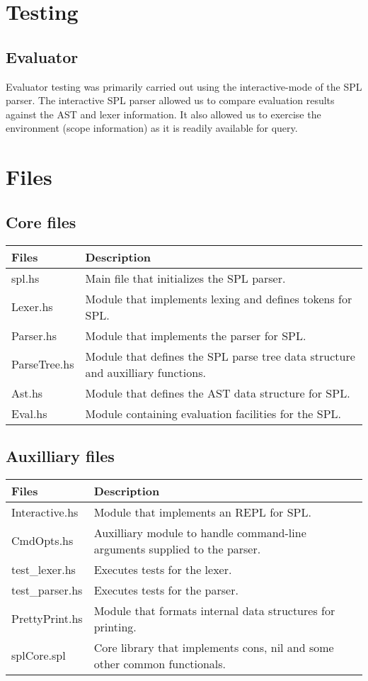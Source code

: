 \documentclass{article}
\begin{document}
\section{Testing}

\subsection{Evaluator}
Evaluator testing was primarily carried out using the interactive-mode of the SPL parser.
The interactive SPL parser allowed us to compare evaluation results against the AST and lexer information.
It also allowed us to exercise the environment (scope information) as it is readily available for query.

\section{Files}
\subsection{Core files}
\begin{tabular}{|l|l|}
  \hline
{\bf Files}&{\bf Description}\\
  \hline
spl.hs & Main file that initializes the SPL parser.\\
  \hline
Lexer.hs & Module that implements lexing and defines tokens for SPL.\\
  \hline
Parser.hs & Module that implements the parser for SPL.\\
  \hline
ParseTree.hs & Module that defines the SPL parse tree data structure and auxilliary functions.\\
  \hline
Ast.hs & Module that defines the AST data structure for SPL.\\
  \hline
Eval.hs & Module containing evaluation facilities for the SPL.\\
  \hline
\end{tabular}
\subsection{Auxilliary files}
\begin{tabular}{|l|l|}
  \hline
{\bf Files}&{\bf Description}\\
  \hline
Interactive.hs & Module that implements an REPL for SPL.\\
  \hline
CmdOpts.hs & Auxilliary module to handle command-line arguments supplied to the parser.\\
  \hline
test_lexer.hs & Executes tests for the lexer.\\
  \hline
test_parser.hs & Executes tests for the parser.\\
  \hline
PrettyPrint.hs & Module that formats internal data structures for printing.\\
  \hline
splCore.spl & Core library that implements cons, nil and some other common functionals.\\
  \hline
\end{tabular}
\end{document}
